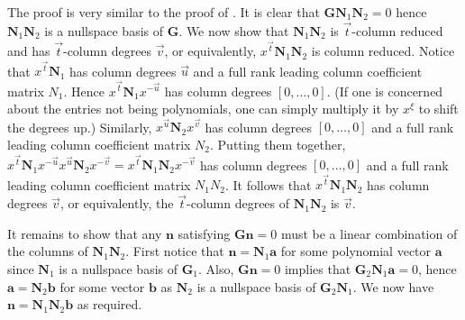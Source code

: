 \begin{pf}
The proof is very similar to the proof of .
It is clear that $\mathbf{G}\mathbf{N}_{1}\mathbf{N}_{2}=0$ hence
$\mathbf{N}_{1}\mathbf{N}_{2}$ is a nullspace basis of $\mathbf{G}$.
We now show that $\mathbf{N}_{1}\mathbf{N}_{2}$ is $\vec{t}$-column
reduced and has $\vec{t}$-column degrees $\vec{v}$, or equivalently,
$x^{\vec{t}}\mathbf{N}_{1}\mathbf{N}_{2}$ is column reduced. Notice
that $x^{\vec{t}}\mathbf{N}_{1}$ has column degrees $\vec{u}$ and
a full rank leading column coefficient matrix $N_{1}$. Hence $x^{\vec{t}}\mathbf{N}_{1}x^{-\vec{u}}$
has column degrees $\left[0,\dots,0\right]$. (If one is concerned
about the entries not being polynomials, one can simply multiply it
by $x^{\xi}$ to shift the degrees up.) Similarly, $x^{\vec{u}}\mathbf{N}_{2}x^{\vec{v}}$
has column degrees $\left[0,\dots,0\right]$ and a full rank leading
column coefficient matrix $N_{2}$. Putting them together, $x^{\vec{t}}\mathbf{N}_{1}x^{-\vec{u}}x^{\vec{u}}\mathbf{N}_{2}x^{-\vec{v}}=x^{\vec{t}}\mathbf{N}_{1}\mathbf{N}_{2}x^{-\vec{v}}$
has column degrees $[0,\dots,0]$ and a full rank leading column coefficient
matrix $N_{1}N_{2}$. It follows that $x^{\vec{t}}\mathbf{N}_{1}\mathbf{N}_{2}$
has column degrees $\vec{v}$, or equivalently, the $\vec{t}$-column
degrees of $\mathbf{N}_{1}\mathbf{N}_{2}$ is $\vec{v}$.

It remains to show that any $\mathbf{n}$ satisfying $\mathbf{G}\mathbf{n}=0$
must be a linear combination of the columns of $\mathbf{N}_{1}\mathbf{N}_{2}$.
First notice that $\mathbf{n}=\mathbf{N}_{1}\mathbf{a}$ for some
polynomial vector $\mathbf{a}$ since $\mathbf{N}_{1}$ is a nullspace
basis of $\mathbf{G}_{1}$. Also, $\mathbf{G}\mathbf{n}=0$ implies
that $\mathbf{G}_{2}\mathbf{N}_{1}\mathbf{a}=0$, hence $\mathbf{a}=\mathbf{N}_{2}\mathbf{b}$
for some vector $\mathbf{b}$ as $\mathbf{N}_{2}$ is a nullspace
basis of $\mathbf{G}_{2}\mathbf{N}_{1}$. We now have $\mathbf{n}=\mathbf{N}_{1}\mathbf{N}_{2}\mathbf{b}$
as required.\end{pf}
